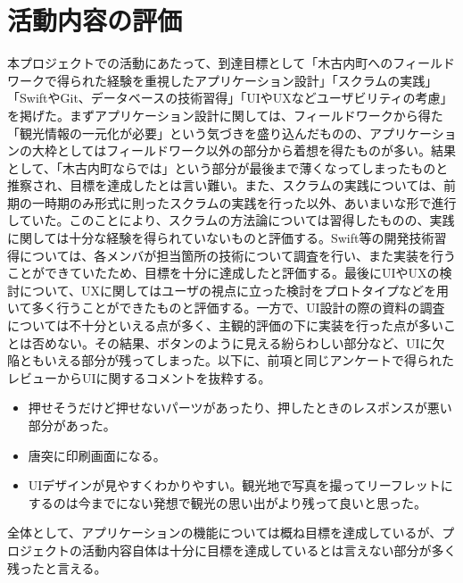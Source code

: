\section{活動内容の評価}
本プロジェクトでの活動にあたって、到達目標として「木古内町へのフィールドワークで得られた経験を重視したアプリケーション設計」「スクラムの実践」「SwiftやGit、データベースの技術習得」「UIやUXなどユーザビリティの考慮」を掲げた。まずアプリケーション設計に関しては、フィールドワークから得た「観光情報の一元化が必要」という気づきを盛り込んだものの、アプリケーションの大枠としてはフィールドワーク以外の部分から着想を得たものが多い。結果として、「木古内町ならでは」という部分が最後まで薄くなってしまったものと推察され、目標を達成したとは言い難い。また、スクラムの実践については、前期の一時期のみ形式に則ったスクラムの実践を行った以外、あいまいな形で進行していた。このことにより、スクラムの方法論については習得したものの、実践に関しては十分な経験を得られていないものと評価する。Swift等の開発技術習得については、各メンバが担当箇所の技術について調査を行い、また実装を行うことができていたため、目標を十分に達成したと評価する。最後にUIやUXの検討について、UXに関してはユーザの視点に立った検討をプロトタイプなどを用いて多く行うことができたものと評価する。一方で、UI設計の際の資料の調査については不十分といえる点が多く、主観的評価の下に実装を行った点が多いことは否めない。その結果、ボタンのように見える紛らわしい部分など、UIに欠陥ともいえる部分が残ってしまった。以下に、前項と同じアンケートで得られたレビューからUIに関するコメントを抜粋する。
\begin{itemize}
\item 押せそうだけど押せないパーツがあったり、押したときのレスポンスが悪い部分があった。
\item 唐突に印刷画面になる。
\item UIデザインが見やすくわかりやすい。観光地で写真を撮ってリーフレットにするのは今までにない発想で観光の思い出がより残って良いと思った。
\end{itemize}
全体として、アプリケーションの機能については概ね目標を達成しているが、プロジェクトの活動内容自体は十分に目標を達成しているとは言えない部分が多く残ったと言える。

